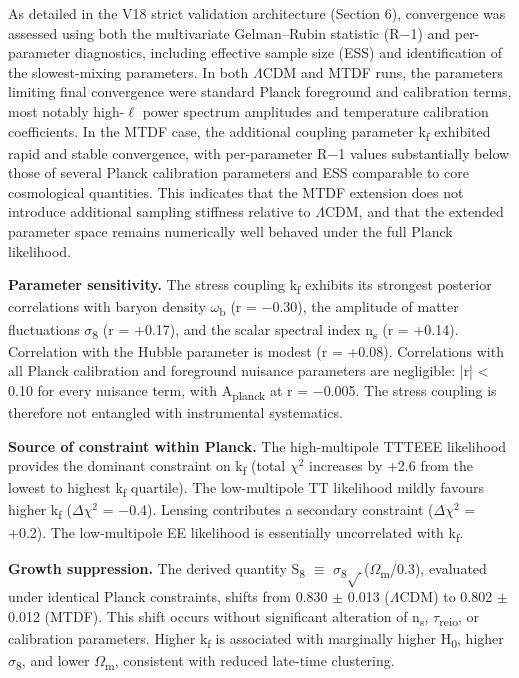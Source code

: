 \documentclass[11pt,a4paper]{article}
\begin{document}
As detailed in the V18 strict validation architecture (Section 6), convergence was assessed using both the multivariate Gelman--Rubin statistic (R$-$1) and per-parameter diagnostics, including effective sample size (ESS) and identification of the slowest-mixing parameters. In both $\Lambda$CDM and MTDF runs, the parameters limiting final convergence were standard Planck foreground and calibration terms, most notably high-$\ell$ power spectrum amplitudes and temperature calibration coefficients. In the MTDF case, the additional coupling parameter k\textsubscript{f} exhibited rapid and stable convergence, with per-parameter R$-$1 values substantially below those of several Planck calibration parameters and ESS comparable to core cosmological quantities. This indicates that the MTDF extension does not introduce additional sampling stiffness relative to $\Lambda$CDM, and that the extended parameter space remains numerically well behaved under the full Planck likelihood.

\textbf{Parameter sensitivity.} The stress coupling k\textsubscript{f} exhibits its strongest posterior correlations with baryon density $\omega$\textsubscript{b} (r = $-$0.30), the amplitude of matter fluctuations $\sigma$\textsubscript{8} (r = +0.17), and the scalar spectral index n\textsubscript{s} (r = +0.14). Correlation with the Hubble parameter is modest (r = +0.08). Correlations with all Planck calibration and foreground nuisance parameters are negligible: |r| < 0.10 for every nuisance term, with A\textsubscript{planck} at r = $-$0.005. The stress coupling is therefore not entangled with instrumental systematics.

\textbf{Source of constraint within Planck.} The high-multipole TTTEEE likelihood provides the dominant constraint on k\textsubscript{f} (total $\chi$$^{2}$ increases by +2.6 from the lowest to highest k\textsubscript{f} quartile). The low-multipole TT likelihood mildly favours higher k\textsubscript{f} ($\Delta$$\chi$$^{2}$ = $-$0.4). Lensing contributes a secondary constraint ($\Delta$$\chi$$^{2}$ = +0.2). The low-multipole EE likelihood is essentially uncorrelated with k\textsubscript{f}.

\textbf{Growth suppression.} The derived quantity S\textsubscript{8} $\equiv$ $\sigma$\textsubscript{8}$\sqrt{\,}$($\Omega$\textsubscript{m}/0.3), evaluated under identical Planck constraints, shifts from 0.830 $\pm$ 0.013 ($\Lambda$CDM) to 0.802 $\pm$ 0.012 (MTDF). This shift occurs without significant alteration of n\textsubscript{s}, $\tau$\textsubscript{reio}, or calibration parameters. Higher k\textsubscript{f} is associated with marginally higher H\textsubscript{0}, higher $\sigma$\textsubscript{8}, and lower $\Omega$\textsubscript{m}, consistent with reduced late-time clustering.
\end{document}
